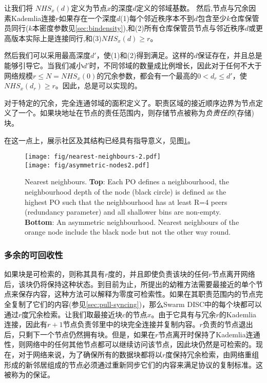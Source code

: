 让我们将 $\mathit{NHS}_x(d)$定义为节点$x$的深度$d$定义的邻域基数。 
然后,节点与冗余因素Kademlia连接$r$如果存在一个深度$d$(1)每个邻近秩序本不到$d$包含至少$k$仓库保管员同行($k$本密度参数见\ref{sec:bindensity}),和(2)所有仓库保管员节点与邻近秩序$d$或更高版本实际上是连接同行,和(3)$\mathit{NHS}_x(d)\geq r$。

然后我们可以采用最高深度$d'$，使(1)和(2)得到满足。这样的$d$保证存在，并且总是能够引导它。当我们减小$d'$时，不同邻域的数量成比例增长，因此对于任何不大于网络规模$r\leq N=\mathit{NHS}_x(0)$的冗余参数，都会有一个最高的$0<d_r\leq d'$，使$\mathit{NHS}_x(d_r)\geq r$。因此，总是可以实现的。 



对于特定的冗余，完全连通邻域的面积定义了。职责区域的接近顺序边界为节点定义了一个。如果块地址在节点的责任范围内，则存储节点被称为\emph{负责任的}(存储)块。

在这一点上，展示社区及其结构已经具有指导意义，见图\ref{fig:nearest-neighbours}。 

\begin{figure}[htbp]
   \centering
   \texttt{[image: fig/nearest-neighbours-2.pdf]}\\
   \texttt{[image: fig/asymmetric-nodes2.pdf]}
   \caption[Nearest neighbours \statusgreen]{Nearest neighbours. \textbf{Top}: Each PO defines a neighbourhood, the neighbourhood depth of the node (black circle) is defined as the highest PO such that the neighbourhood has at least R=4 peers (redundancy parameter) and all shallower bins are non-empty. \textbf{Bottom}: An asymmetric neighbourhood. Nearest neighbours of the orange node include the black node but not the other way round.}
   \label{fig:nearest-neighbours}
\end{figure}


\subsubsection{多余的可回收性}

如果块是可检索的，则称其具有$r$度的，并且即使负责该块的任何$r$节点离开网络后，该块仍将保持这种状态。到目前为止，所提出的幼稚方法需要最接近的单个节点来保存内容，这种方法可以解释为零度可检索性。如果在其职责范围内的节点完全复制了它们的内容(参见\ref{sec:pull-syncing})，那么Swarm DISC中的每个块都可以通过$r$度冗余检索。让我们取最接近块$c$的节点$x$。由于它具有与冗余$r$的Kademlia连接，因此有$r+1$节点负责邻里中的块完全连接并复制内容。$r$负责的节点退出后，只剩下一个节点仍然拥有块。但是，如果在$r$节点离开时保持了Kademlia连通性，则网络中的任何其他节点都可以继续访问该节点，因此块仍然是可检索的。现在，对于网络来说，为了确保所有的数据块都将以$r$度保持冗余检索，由网络重组形成的新邻居组成的节点必须通过重新同步它们的内容来满足协议的复制标准。这被称为的保证。

